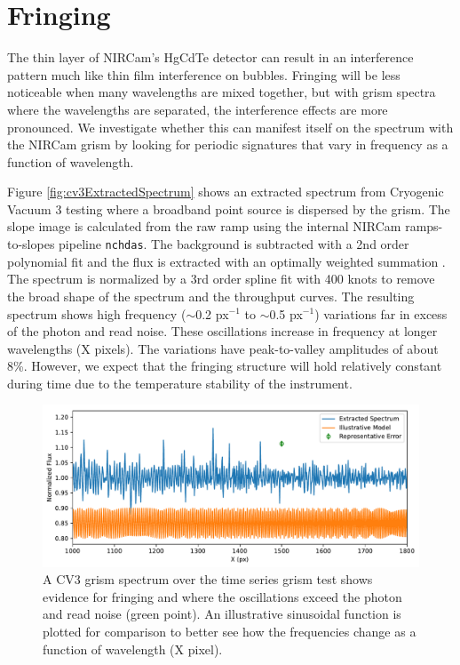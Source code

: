 \documentclass{aastex62}
\begin{document}
\clearpage
\section{Fringing}

The thin layer of NIRCam's HgCdTe detector can result in an interference pattern much like thin film interference on bubbles.
Fringing will be less noticeable when many wavelengths are mixed together, but with grism spectra where the wavelengths are separated, the interference effects are more pronounced.
We investigate whether this can manifest itself on the spectrum with the NIRCam grism by looking for periodic signatures that vary in frequency as a function of wavelength.

Figure \ref{fig:cv3ExtractedSpectrum} shows an extracted spectrum from Cryogenic Vacuum 3 testing where a broadband point source is dispersed by the grism.
The slope image is calculated from the raw ramp using the internal NIRCam ramps-to-slopes pipeline \texttt{nchdas}.
The background is subtracted with a 2nd order polynomial fit and the flux is extracted with an optimally weighted summation \citep[e.g.][]{horne1986optimalE}.
The spectrum is normalized by a 3rd order spline fit with 400 knots to remove the broad shape of the spectrum and the throughput curves.
The resulting spectrum shows high frequency ($\sim$0.2 px$^{-1}$ to $\sim$0.5 px$^{-1}$) variations far in excess of the photon and read noise.
These oscillations increase in frequency at longer wavelengths (X pixels).
The variations have peak-to-valley amplitudes of about 8\%.
However, we expect that the fringing structure will hold relatively constant during time due to the temperature stability of the instrument.


\begin{figure}[!hbtp]
\centering
\includegraphics[width=.99\columnwidth]{fringing_grism_cv3.pdf}
\caption{A CV3 grism spectrum over the time series grism test shows evidence for fringing and where the oscillations exceed the photon and read noise (green point).
An illustrative sinusoidal function is plotted for comparison to better see how the frequencies change as a function of wavelength (X pixel).
}\label{fig:CV3GrismSpecFringing}
\end{figure}
\end{document}

